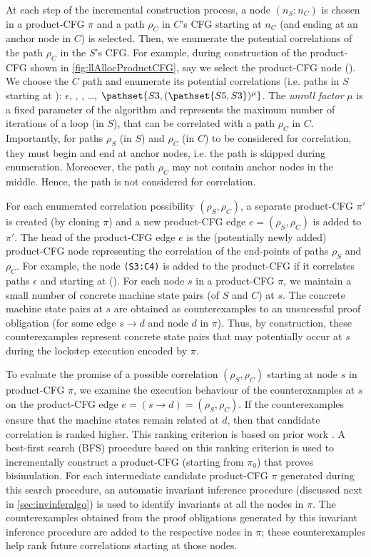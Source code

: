 At each step of the incremental construction process, a node $(n_S\!:\!n_C)$ is chosen in a product-CFG $\pi$
and a path $\rho_C$ in $C$'s CFG starting at $n_C$ (and ending at an anchor node in $C$) is selected.
Then, we enumerate the potential correlations of the path $\rho_C$ in the $S$'s CFG.
For example, during construction of the product-CFG shown in \cref{fig:llAllocProductCFG},
say we select the product-CFG node ().
We choose the $C$ path  and enumerate its potential correlations (i.e. paths in $S$ starting at ):
$\epsilon$, , , \ldots, $\pathset{S3,(\pathset{S5,S3})^\mu}$.
The {\em unroll factor} $\mu$ is a fixed parameter of the algorithm and represents the maximum number of iterations of a loop (in $S$),
that can be correlated with a path $\rho_C$ in $C$.
Importantly, for paths $\rho_S$ (in $S$) and $\rho_C$ (in $C$) to be considered for correlation,
they must begin and end at anchor nodes, i.e. the path  is skipped during enumeration.
Moreoever, the path $\rho_C$ may not contain anchor nodes in the middle.
Hence, the path  is not considered for correlation.

For each enumerated correlation possibility $(\rho_S,\rho_C)$, a separate product-CFG $\pi'$ is
created (by cloning $\pi$) and a new product-CFG edge $e=(\rho_S,\rho_C)$ is added to $\pi'$.
The head of the product-CFG edge $e$ is the (potentially newly added) product-CFG node representing
the correlation of the end-points of paths $\rho_S$ and $\rho_C$. For example, the node {\tt (S3:C4)} is added
to the product-CFG if it correlates paths $\epsilon$ and  starting at ().
For each node $s$ in a product-CFG $\pi$, we maintain a small number of
concrete machine state pairs (of $S$ and $C$) at $s$.
The concrete machine state pairs at $s$ are obtained as counterexamples to an unsucessful proof
obligation  (for some edge $s \rightarrow d$ and node $d$ in $\pi$).
Thus, by construction, these counterexamples represent concrete state pairs that may potentially occur
at $s$ during the lockstep execution encoded by $\pi$.

To evaluate the promise of a possible correlation $(\rho_S,\rho_C)$ starting at node $s$
in product-CFG $\pi$, we examine the execution behaviour of the counterexamples at $s$ on
the product-CFG edge $e=(s\rightarrow d)=(\rho_S,\rho_C)$.
If the counterexamples ensure that the machine states remain related at $d$,
then that candidate correlation is ranked higher.
This ranking criterion is based on prior work \cite{oopsla20}.
A best-first search (BFS) procedure based on this ranking criterion is used to incrementally construct
a product-CFG (starting from $\pi_0$) that proves bisimulation.
For each intermediate candidate product-CFG $\pi$ generated during this search procedure,
an automatic invariant inference procedure (discussed next in \cref{sec:invinferalgo}) is
used to identify invariants at all the nodes in $\pi$.
The counterexamples obtained from the proof obligations generated by this invariant inference
procedure are added to the respective nodes in $\pi$; these counterexamples help rank
future correlations starting at those nodes.

